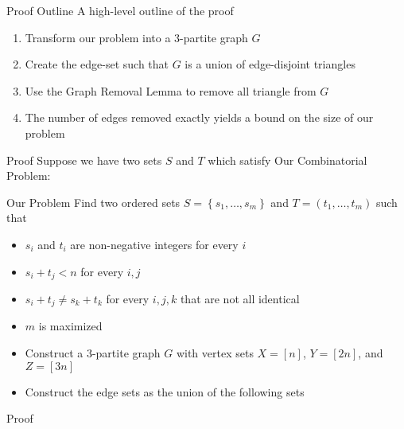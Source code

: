 \begin{frame}{Proof Outline}
A high-level outline of the proof
\begin{enumerate}
	\item Transform our problem into a $3$-partite graph $G$
	\item Create the edge-set such that $G$ is a union of edge-disjoint triangles
	\item Use the Graph Removal Lemma to remove all triangle from $G$
	\item The number of edges removed exactly yields a bound on the size of our problem
\end{enumerate}
\end{frame}

\begin{frame}{Proof}
Suppose we have two sets $S$ and $T$ which satisfy Our Combinatorial Problem:
{
	\begin{block}{Our Problem}
		Find two ordered sets $S = \left\lbrace s_1,\dotsc, s_m\right\rbrace$ and $T = \left(t_1,\dotsc, t_m\right)$ such that
		\begin{itemize}
			\item $s_i$ and $t_i$ are non-negative integers for every $i$
			\item $s_i + t_j < n$ for every $i,j$
			\item $s_i + t_j \neq s_k + t_k$ for every $i,j,k$ that are not all identical
			\item $m$ is maximized
		\end{itemize}
\end{block}}


\begin{itemize}
	\item<3-> Construct a 3-partite graph $G$ with vertex sets $X = [n]$, $Y = [2n]$, and $Z = [3n]$
	\item<4-> Construct the edge sets as the union of the following sets
\end{itemize}

\end{frame}

\begin{frame}{Proof}


	
\end{frame}

